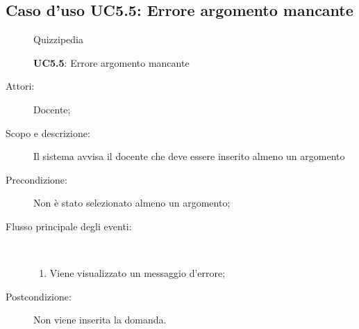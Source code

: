 \subsection{Caso d'uso UC5.5: Errore argomento mancante}
	\begin{figure}[H]
		\centering
		\begin{resizedtikzpicture}{\textwidth}
		\begin{umlsystem}[x=0, fill=lightgray!20]{Quizzipedia}
		\end{umlsystem}
		\end{resizedtikzpicture}
		\caption{\textbf{UC5.5}: Errore argomento mancante}
		\label{UC5.5}
	\end{figure}
\begin{description}
\item[Attori:] Docente;
\item[Scopo e descrizione:] Il sistema avvisa il docente che deve essere inserito almeno un argomento
      \item[Precondizione:] Non è stato selezionato almeno un argomento;

        \item[Flusso principale degli eventi:] \ 
 \begin{enumerate}
          \item Viene visualizzato un messaggio d'errore;

      \end{enumerate}
    \item[Postcondizione:] Non viene inserita la domanda.
  \end{description}
\hypertarget{UC5.6}{}
